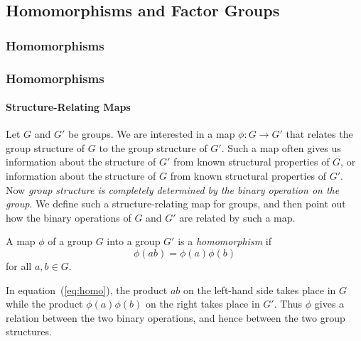\subsection{Homomorphisms and Factor Groups}
{\subsubsection{Homomorphisms}}
{\subsubsection{Homomorphisms\protect\footnotemark}
}
\paragraph{Structure-Relating Maps}
Let $G$ and $G'$ be groups.  We are interested in a map
$\phi:G\to G'$ that relates the group structure of $G$ to the
group structure of $G'$.  Such a map often gives us information about
the structure of $G'$ from known structural properties of $G$, or
information about the structure of $G$ from known structural
properties of $G'$.  Now \emph{group structure is completely
determined by the binary operation on the group}.  We define such a
structure-relating map for groups, and then point out how the binary
operations of $G$ and $G'$ are related by such a map.

\begin{definition}[Homomorphism]
A map $\phi$ of a group $G$ into a group $G'$ is a \emph{homomorphism}
if
\begin{equation}\label{eq:homo}
 \phi(ab) = \phi(a) \phi(b)
\end{equation}
for all $a,b\in G$.
\end{definition}
In equation~(\ref{eq:homo}), the product $ab$ on the left-hand side
takes place in $G$ while the product $\phi(a)\phi(b)$ on the right
takes place in $G'$.  Thus $\phi$ gives a relation between the two
binary operations, and hence between the two group structures.

